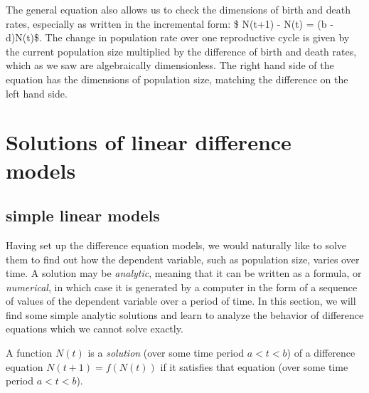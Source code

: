 \documentclass[
  letterpaper,
  DIV=11,
  numbers=noendperiod]{scrreprt}
\begin{document}
The general equation also allows us to check the dimensions of birth and
death rates, especially as written in the incremental form: \$ N(t+1) -
N(t) = (b - d)N(t)\$. The change in population rate over one
reproductive cycle is given by the current population size multiplied by
the difference of birth and death rates, which as we saw are
algebraically dimensionless. The right hand side of the equation has the
dimensions of population size, matching the difference on the left hand
side. \cite{edelstein-keshet_mathematical_2005}

\hypertarget{solutions-of-linear-difference-models}{%
\section{Solutions of linear difference
models}\label{solutions-of-linear-difference-models}}

\label{sec:math14}

\hypertarget{simple-linear-models}{%
\subsection{simple linear models}\label{simple-linear-models}}

Having set up the difference equation models, we would naturally like to
solve them to find out how the dependent variable, such as population
size, varies over time. A solution may be
 \emph{analytic}, meaning
that it can be written as a formula, or
 \emph{numerical}, in which
case it is generated by a computer in the form of a sequence of values
of the dependent variable over a period of time. In this section, we
will find some simple analytic solutions and learn to analyze the
behavior of difference equations which we cannot solve
exactly.

\begin{tcolorbox}[enhanced jigsaw, arc=.35mm, colframe=quarto-callout-note-color-frame, left=2mm, opacitybacktitle=0.6, breakable, title=\textcolor{quarto-callout-note-color}{\faInfo}\hspace{0.5em}{Definition}, toprule=.15mm, coltitle=black, bottomtitle=1mm, toptitle=1mm, colback=white, leftrule=.75mm, colbacktitle=quarto-callout-note-color!10!white, titlerule=0mm, opacityback=0, rightrule=.15mm, bottomrule=.15mm]

A function \(N(t)\) is a
\emph{solution} (over some time
period \(a < t < b\)) of a difference equation \(N(t+1) = f(N(t))\) if
it satisfies that equation (over some time period \(a < t < b\)).

\end{tcolorbox}
\end{document}
